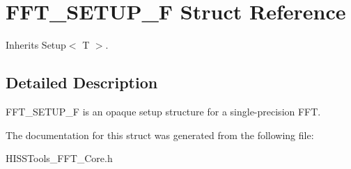 \hypertarget{struct_float_setup}{}\section{F\+F\+T\+\_\+\+S\+E\+T\+U\+P\+\_\+F Struct Reference}
\label{struct_float_setup}


Inherits Setup$<$ T $>$.



\subsection{Detailed Description}
F\+F\+T\+\_\+\+S\+E\+T\+U\+P\+\_\+F is an opaque setup structure for a single-\/precision F\+FT. 

The documentation for this struct was generated from the following file\+:\begin{DoxyCompactItemize}
\item 
H\+I\+S\+S\+Tools\+\_\+\+F\+F\+T\+\_\+\+Core.\+h\end{DoxyCompactItemize}

